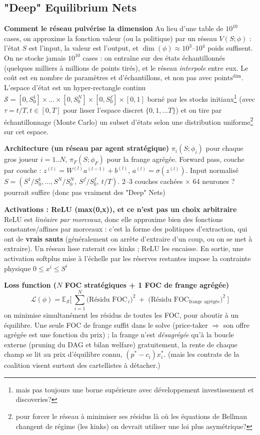 \documentclass[11pt]{article}
\begin{document}
\subsection{ "Deep" Equilibrium Nets }
\label{sec:A}
\textbf{Comment le réseau pulvérise la dimension} Au lieu d'une table de $10^{10}$ cases, on approxime
la fonction valeur (ou la politique) par un réseau $V(S;\phi)$ : l'état $S$ est l'input, la
valeur est l'output, et $\dim(\phi)\approx 10^3$--$10^4$ poids suffisent. On ne stocke jamais
$10^{10}$ cases : on entra\^ine sur des états échantillonnés (quelques milliers à millions de
points tirés), et le réseau \emph{interpole} entre eux. Le co\^ut est en nombre de paramètres et
d'échantillons, et non pas avec $\text{points}^{\dim}$. L'espace d'état est un hyper-rectangle continu $\mathcal{S}=[0,S_0^1] \times...\times [0,S_0^N]\times [0,S_0^f]\times [0,1]$ borné par les stocks initiaux\footnote{mais pas toujours une borne supérieure avec développement investissement et discoveries?} (avec $\tau = t/T, t \in [0,T]$ pour lisser l'espace discret $\{0,1,...T\}$) et on tire par échantillonnage (Monte Carlo) un subset d'états selon une distribution uniforme\footnote{pour forcer le réseau à minimiser ses résidus là où les équations de Bellman changent de régime (les kinks) on devrait utiliser une loi plus asymétrique?} sur cet espace.  

\textbf{Architecture (un réseau par agent stratégique)} $\pi_i(S;\phi_i)$ pour chaque gros joueur $i=1..N$,
$\pi_F(S;\phi_F)$ pour la frange agrégée. Forward pass, couche
par couche : $z^{(l)}=W^{(l)}a^{(l-1)}+b^{(l)}$, $a^{(l)}=\sigma(z^{(l)})$. Input normalisé
$S=(S^1/S^1_0,\dots,S^N/S^N_0,\ S^f/S^f_0,\ t/T)$. 2--3 couches cachées $\times$ 64 neurones ? pourrait suffire (donc pas vraiment des "Deep" Nets)

\textbf{Activations : ReLU (max(0,x)), et ce n'est pas un choix arbitraire} ReLU est \emph{linéaire par morceaux}, donc
elle approxime bien des fonctions constantes/affines par morceaux : c'est la forme
des politiques d'extraction, qui ont de \textbf{vrais sauts} (généralement on arrête d'extraire d'un coup, ou on se met à extraire). Un réseau
lisse raterait ces kinks ; ReLU les encaisse. En sortie, une activation softplus mise à
l'échelle par les réserves restantes impose la contrainte physique $0\le x^i\le S^i$ 

\textbf{Loss function ($N$ FOC stratégiques + 1 FOC de frange agrégée)}
\[
\mathcal{L}(\phi)=\mathbb{E}_{\mathcal{S}}\Big[\ \sum_{i=1}^{N}\big(\text{Résidu FOC}_{\,i}\big)^2\;+\;\big(\text{Résidu FOC}_{\text{frange agrégée}}\big)^2\ \Big]
\]
on minimise simultanément les résidus de toutes les FOC, pour aboutir à un équilibre. Une seule FOC de frange suffit dans le solve (price-taker $\Rightarrow$ son offre agrégée est une fonction du prix) ; la frange n'est \emph{désagrégée} qu'à la boucle externe (pruning du DAG et bilan welfare) gratuitement, la rente de chaque champ se lit au prix d'équilibre connu, $(p^*-c_i)x_i^*$. (mais les contrats de la coalition visent surtout des cartellistes à détacher.)
\end{document}
